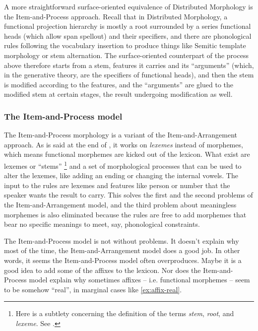 \documentclass[UTF8, a4paper, oneside, scheme=plain]{ctexart}
\newcommand*{\term}[1]{\emph{#1}}
\begin{document}
A more straightforward surface-oriented equivalence of Distributed Morphology
is the Item-and-Process approach.
Recall that in Distributed Morphology, a functional projection hierarchy
is mostly a root surrounded by a series functional heads (which allow span spellout) and their specifiers,
and there are phonological rules following the vocabulary insertion 
to produce things like Semitic template morphology \citet{tucker2011morphosyntax}
or stem alternation.
The surface-oriented counterpart of the process above 
therefore starts from a stem, features it carries and its ``arguments''
(which, in the generative theory, are the specifiers of functional heads),
and then the stem is modified according to the features,
and the ``arguments'' are glued to the modified stem at certain stages,
the result undergoing modification as well.

\subsubsection{The Item-and-Process model}

The Item-and-Process morphology is a variant of the Item-and-Arrangement approach.
As is said at the end of ,
it works on \emph{lexemes} instead of morphemes,
which means functional morphemes are kicked out of the lexicon.
What exist are lexemes or ``stems''%
\footnote{
    Here is a subtlety concerning the definition of the terms 
    \term{stem}, \term{root}, and \term{lexeme}.
    See .
}
and a set of morphological processes 
that can be used to alter the lexemes,
like adding an ending or changing the internal vowels.
The input to the rules are lexemes and 
features like person or number that the speaker wants the result to carry.
This solves the first and the second problems of the Item-and-Arrangement model,
and the third problem about meaningless morphemes 
is also eliminated because 
the rules are free to add morphemes that bear no specific meanings 
to meet, say, phonological constraints.

The Item-and-Process model is not without problems.
It doesn't explain why most of the time,
the Item-and-Arrangement model does a good job.
In other words,
it seems the Item-and-Process model often overproduces.
Maybe it is a good idea to add some of the affixes to the lexicon.
Nor does the Item-and-Process model 
explain why sometimes affixes -- i.e. functional morphemes -- seem to be somehow ``real'',
in marginal cases like \eqref{ex:affix-real}.
\end{document}
